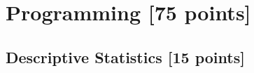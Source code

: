 \documentclass[12pt]{article}
\begin{document}
\section{Programming [75 points]}





\subsection{Descriptive Statistics [15 points]}
\end{document}
